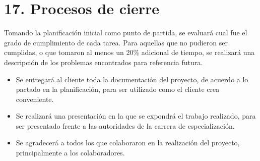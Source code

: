 \documentclass[11pt]{charter}
\begin{document}
\begin{longtable}{|m{1cm}|m{3.5cm}|m{2.2cm}|m{2cm}|m{3cm}|m{1.5cm}|}
\end{longtable}


\section{17. Procesos de cierre}    
\label{sec:cierre}

Tomando la planificación inicial como punto de partida, se evaluará cual fue el grado de cumplimiento de cada tarea. Para aquellas que no pudieron ser cumplidas, o que tomaron al menos un 20\% adicional de tiempo, se realizará una descripción de los problemas encontrados para referencia futura.

\begin{itemize}
\item Se entregará al cliente toda la documentación del proyecto, de acuerdo a lo pactado en la planificación, para ser utilizado como el cliente crea conveniente.
\item Se realizará una presentación en la que se expondrá el trabajo realizado, para ser presentado frente a las autoridades de la carrera de especialización.
\item Se agradecerá a todos los que colaboraron en la realización del proyecto, principalmente a los colaboradores.
\end{itemize}
\end{document}
